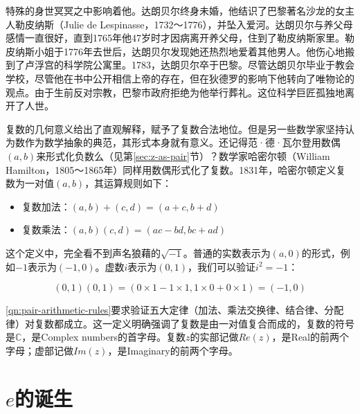 \documentclass[b5paper]{ctexart}
\begin{document}
\begin{mdframed}
特殊的身世冥冥之中影响着他。达朗贝尔终身未婚，他结识了巴黎著名沙龙的女主人勒皮纳斯（Julie de Lespinasse，1732～1776），并坠入爱河。达朗贝尔与养父母感情一直很好，直到1765年他47岁时才因病离开养父母，住到了勒皮纳斯家里。勒皮纳斯小姐于1776年去世后，达朗贝尔发现她还热烈地爱着其他男人。他伤心地搬到了卢浮宫的科学院公寓里\cite{Ronald-2024}。1783，达朗贝尔卒于巴黎。尽管达朗贝尔毕业于教会学校，尽管他在书中公开相信上帝的存在，但在狄德罗的影响下他转向了唯物论的观点。由于生前反对宗教，巴黎市政府拒绝为他举行葬礼。这位科学巨匠孤独地离开了人世。
\end{mdframed}

复数的几何意义给出了直观解释，赋予了复数合法地位。但是另一些数学家坚持认为数作为数学抽象的典范，其形式本身就有意义。还记得范·德·瓦尔登用数偶$(a, b)$来形式化负数么（见第\ref{sec:z-as-pair}节）？数学家哈密尔顿（William Hamilton，1805～1865年）同样用数偶形式化了复数。1831年，哈密尔顿定义复数为一对值$(a, b)$，其运算规则如下：

\begin{itemize}
\item 复数加法：$(a, b) + (c, d) = (a + c, b + d)$
\item 复数乘法：$(a, b) (c, d) = (ac - bd, bc + ad)$
\end{itemize}

这个定义中，完全看不到声名狼藉的$\sqrt{-1}$。普通的实数表示为$(a, 0)$的形式，例如$-1$表示为$(-1, 0)$。虚数$i$表示为$(0, 1)$，我们可以验证$i^2 = -1$：

\[(0, 1)(0, 1) = (0 \times 1 - 1 \times 1, 1 \times 0 + 0 \times 1) = (-1, 0)\]

\cref{qn:pair-arithmetic-rules}要求验证五大定律（加法、乘法交换律、结合律、分配律）对复数都成立。这一定义明确强调了复数是由一对值复合而成的，复数的符号是$\mathbb{C}$，是Complex numbers的首字母。复数$z$的实部记做$Re(z)$，是Real的前两个字母；虚部记做$Im(z)$，是Imaginary的前两个字母。


\section{$e$的诞生}
\end{document}
